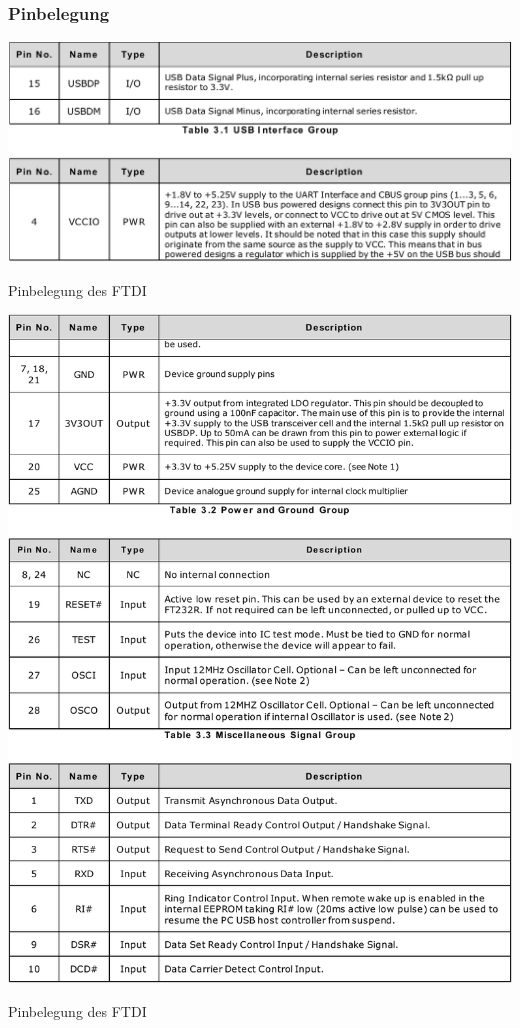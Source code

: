 \subsubsection{Pinbelegung}
\begin{table}[htb]
    \centering
    \includegraphics[width=\textwidth]{Schuh/Pictures/usbtouart-ftdi-pin1}
    \caption[Pinbelegung des FTDI]{Pinbelegung des FTDI \cite{ftdi:ft232r}}
    \label{tab:usbtouart-ftdi-pin}
\end{table}
\begin{table}[htb]\ContinuedFloat
    \centering
    \includegraphics[width=\textwidth]{Schuh/Pictures/usbtouart-ftdi-pin2}
    \caption[Pinbelegung des FTDI]{Pinbelegung des FTDI \cite{ftdi:ft232r}}
\end{table}
